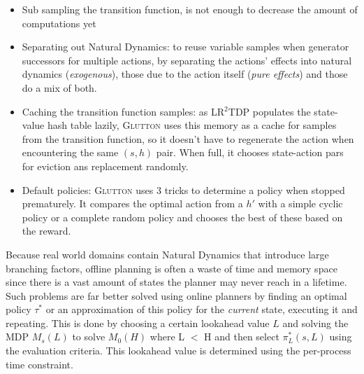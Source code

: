 \documentclass[runningheads,a4paper]{llncs}
\begin{document}
\begin{itemize}
	\item Sub sampling the transition function, is not enough to decrease the amount of computations yet
	\item Separating out Natural Dynamics: to reuse variable samples when generator successors for multiple actions, by separating the actions' effects into natural dynamics (\emph{exogenous}), those due to the action itself (\emph{pure effects}) and those do a mix of both.
	\item Caching the transition function samples: as LR$^2$TDP populates the state-value hash table lazily, \textsc{Glutton} uses  this memory as a cache for samples from the transition function, so it doesn't have to regenerate the action when encountering the same $(s,h)$ pair. When full, it chooses state-action pars for eviction ans replacement randomly.
	\item Default policies: \textsc{Glutton} uses 3 tricks to determine a policy when stopped prematurely. It compares the optimal action from a $h'$ with a simple cyclic policy or a complete random policy and chooses the best of these based on the reward.
\end{itemize}

%

Because real world domains contain Natural Dynamics that introduce large branching factors, offline planning is often a waste of time and memory space since there is a vast amount of states the planner may never reach in a lifetime. Such problems are far better solved using online planners by finding an optimal policy $\tau^*$ or an approximation of this policy for the \emph{current} state, executing it and repeating. This is done by choosing a certain lookahead value $L$ and solving the MDP $M_s(L)$ to solve $M_0(H)$ where L $<$ H and then select $\pi^*_L(s,L)$ using the evaluation criteria. This lookahead value is determined using the per-process time constraint.
\end{document}
